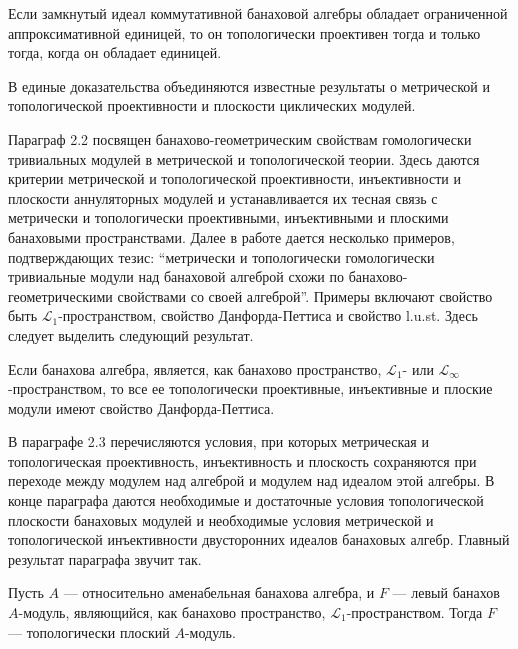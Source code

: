 \begin{theorem*}[\ref{GoodCommIdealMetTopProjIsUnital}] Если замкнутый идеал коммутативной банаховой алгебры обладает ограниченной аппроксимативной единицей, то он топологически проективен тогда и только тогда, когда он обладает единицей.
\end{theorem*} 

В единые доказательства объединяются известные результаты о метрической и топологической проективности и плоскости циклических модулей. 

Параграф 2.2 посвящен банахово-геометрическим свойствам гомологически тривиальных модулей в метрической и топологической теории. Здесь даются критерии метрической и топологической проективности, инъективности и плоскости аннуляторных модулей и устанавливается их тесная связь с метрически и топологически проективными, инъективными и плоскими банаховыми пространствами. Далее в работе дается несколько примеров, подтверждающих тезис: ``метрически и топологически гомологически тривиальные модули над банаховой алгеброй схожи по банахово-геометрическими свойствами со своей алгеброй''. Примеры включают свойство быть $\mathscr{L}_1$-пространством, свойство Данфорда-Петтиса и свойство l.u.st. Здесь следует выделить следующий результат.

\begin{theorem*}[\ref{TopProjInjFlatModOverMthscrL1OrLInftySpHaveDPP}] Если банахова алгебра, является, как банахово пространство, $\mathscr{L}_1$- или $\mathscr{L}_\infty$-пространством, то все ее топологически проективные, инъективные и плоские модули имеют свойство Данфорда-Петтиса.
\end{theorem*}

В параграфе 2.3 перечисляются условия, при которых метрическая и топологическая проективность, инъективность и плоскость сохраняются при переходе между модулем над алгеброй и модулем над идеалом этой алгебры. В конце параграфа даются необходимые и достаточные условия топологической плоскости банаховых модулей и необходимые условия метрической и топологической инъективности двусторонних идеалов банаховых алгебр. Главный результат параграфа звучит так.

\begin{theorem*}[\ref{TopL1FlatModAoverAmenBanAlg}] Пусть $A$ --- относительно аменабельная банахова алгебра, и $F$ --- левый банахов $A$-модуль, являющийся, как банахово пространство, $\mathscr{L}_1$-пространством. Тогда $F$ --- топологически плоский $A$-модуль.
\end{theorem*}

